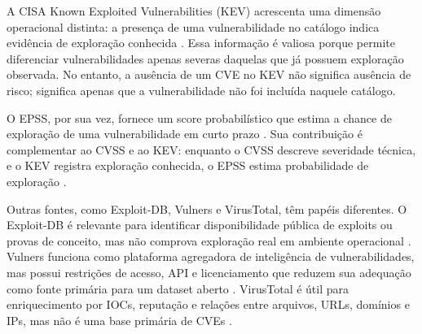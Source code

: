 A CISA Known Exploited Vulnerabilities (KEV) acrescenta uma dimensão operacional distinta: a presença de uma vulnerabilidade no catálogo indica evidência de exploração conhecida \cite{cisa_kev_catalog}. Essa informação é valiosa porque permite diferenciar vulnerabilidades apenas severas daquelas que já possuem exploração observada. No entanto, a ausência de um CVE no KEV não significa ausência de risco; significa apenas que a vulnerabilidade não foi incluída naquele catálogo.

O EPSS, por sua vez, fornece um score probabilístico que estima a chance de exploração de uma vulnerabilidade em curto prazo \cite{first_epss}. Sua contribuição é complementar ao CVSS e ao KEV: enquanto o CVSS descreve severidade técnica, e o KEV registra exploração conhecida, o EPSS estima probabilidade de exploração \cite{first_cvss,nvd_cvss_metrics,cisa_kev_catalog,first_epss}.

Outras fontes, como Exploit-DB, Vulners e VirusTotal, têm papéis diferentes. O Exploit-DB é relevante para identificar disponibilidade pública de exploits ou provas de conceito, mas não comprova exploração real em ambiente operacional \cite{exploitdb}. Vulners funciona como plataforma agregadora de inteligência de vulnerabilidades, mas possui restrições de acesso, API e licenciamento que reduzem sua adequação como fonte primária para um dataset aberto \cite{vulners,vulners_api_docs}. VirusTotal é útil para enriquecimento por IOCs, reputação e relações entre arquivos, URLs, domínios e IPs, mas não é uma base primária de CVEs \cite{virustotal_api_v3}.

